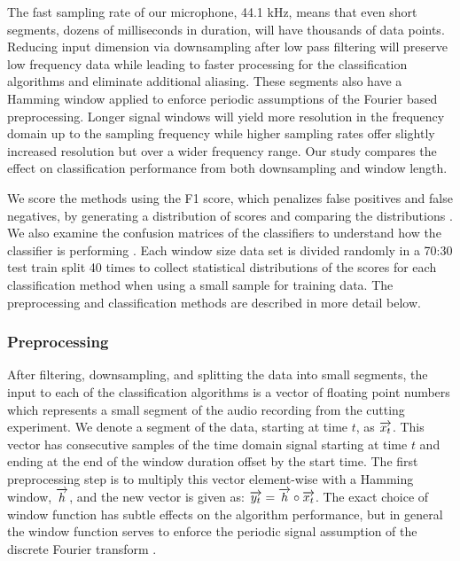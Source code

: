 The fast sampling rate of our microphone, 44.1 kHz, means that even short segments,
dozens of milliseconds in duration, will have thousands of data points.
Reducing input dimension via downsampling after low pass filtering will preserve 
low frequency data while leading to faster processing for the classification algorithms and 
eliminate additional aliasing.
These segments also have a Hamming window applied to enforce periodic assumptions of the Fourier based preprocessing.
Longer signal windows will yield more resolution in the frequency domain up to the sampling frequency
while higher sampling rates offer slightly increased resolution but over a wider frequency range.
Our study compares the effect on classification performance from both downsampling and window length.

We score the methods using the F1 score, which penalizes false positives and false negatives,
by generating a distribution of scores and comparing the distributions \cite{Goutte2005}.
We also examine the confusion matrices of the classifiers to understand 
how the classifier is performing \cite{Bramer2007}.
Each window size data set is divided randomly in a 70:30 test train split 40 times 
to collect statistical distributions of the scores for each classification method 
when using a small sample for training data.
The preprocessing and classification methods are described in more detail below.

\subsubsection{Preprocessing}

After filtering, downsampling, and splitting the data into small segments,
the input to each of the classification algorithms is a vector of floating point numbers 
which represents a small segment of the audio recording from the cutting experiment. 
We denote a segment of the data, starting at time $t$, as $\overrightarrow{x_t}$.
This vector has consecutive samples of the time domain signal starting at time $t$ and 
ending at the end of the window duration offset by the start time.
The first preprocessing step is to multiply this vector element-wise with a Hamming window, $\overrightarrow{h}$, and
the new vector is given as: $\overrightarrow{y_t} = \overrightarrow{h} \circ \overrightarrow{x_t}$.
The exact choice of window function has subtle effects on the algorithm performance, 
but in general the window function serves to enforce the periodic signal assumption of the 
discrete Fourier transform \cite{Harris1978}. 

